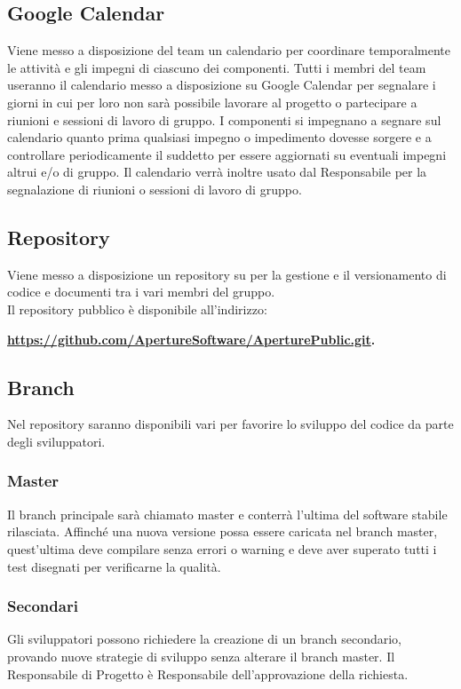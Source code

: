 \subsection{Google Calendar}
\label{4.2}
Viene messo a disposizione del team un calendario per coordinare temporalmente le attività e gli impegni di ciascuno dei componenti.
Tutti i membri del team useranno il calendario messo a disposizione su Google Calendar per segnalare i giorni in cui per loro non sarà possibile lavorare al progetto o partecipare a riunioni e sessioni di lavoro di gruppo. I componenti si impegnano a segnare sul calendario quanto prima qualsiasi impegno o impedimento dovesse sorgere e a controllare periodicamente il suddetto per essere aggiornati su eventuali impegni altrui e/o di gruppo.
Il calendario verrà inoltre usato dal Responsabile per la segnalazione di riunioni o sessioni di lavoro di gruppo.

\subsection{Repository}
\label{4.3}
Viene messo a disposizione un repository  su  per la gestione e il versionamento di codice e documenti tra i vari membri del gruppo.\\
Il repository pubblico è disponibile all'indirizzo: \\
\begin{center}
\textbf{\url{https://github.com/ApertureSoftware/AperturePublic.git}.}
\end{center}

\subsection{Branch}
\label{4.4}
Nel repository saranno disponibili vari  per favorire lo sviluppo del codice da parte degli sviluppatori.

\subsubsection{Master}
\label{4.4.1}
Il branch principale sarà chiamato master e conterrà l'ultima  del software stabile rilasciata. Affinché una nuova versione possa essere caricata nel branch master, quest'ultima deve compilare senza errori o warning e deve aver superato tutti i test disegnati per verificarne la qualità.

\subsubsection{Secondari}
\label{4.4.2}
Gli sviluppatori possono richiedere la creazione di un branch secondario, provando nuove strategie di sviluppo senza alterare il branch master. Il Responsabile di Progetto è Responsabile dell'approvazione della richiesta.

